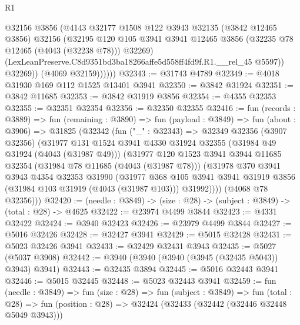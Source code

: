 \begin{lexlean}{R1}
\begin{coremodule}
                  @32156
                  @3856
                  (@4143
                    @32177
                    @1508
                    @122
                    @3943
                    @32135
                    (@3842 @12465 @3856)
                    @32156
                    (@32195
                      @120
                      @105
                      @3941
                      @3941
                      @12465
                      @3856
                      (@32235 @78 @12465 (@4043 (@32238 @78)))
                      @32269)
                    (LexLeanPreserve.C8d9351bd3ba18266affe5d558ff4fd9f.R1.__rel_45 @5597))
                  @32269))
              (@4069 @32159))))))
@32343 := @31743 @4789
@32349 := @4018 @31930 @169 @112 @1525 @13401 @3941
@32350 := @3842 @31924
@32351 := @3842 @11685
@32353 := @3842 @31919 @3856
@32354 := @4355 @32353
@32355 := @32351 @32354
@32356 := @32350 @32355
@32416 := fun (records : @3889) =>
  fun (remaining : @3890) =>
  fun (payload : @3849) =>
  fun (about : @3906) =>
  @31825
    (@32342
      (fun ("_" : @32343) =>
      @32349
        @32356
        (@3907 @32356)
        (@31977
          @131
          @1524
          @3941
          @4330
          @31924
          @32355
          (@31984 @49 @31924 (@4043 (@31987 @49)))
          (@31977
            @120
            @1523
            @3941
            @3944
            @11685
            @32354
            (@31984 @78 @11685 (@4043 (@31987 @78)))
            (@31978
              @370
              @3941
              @3943
              @4354
              @32353
              @31990
              (@31977
                @368
                @105
                @3941
                @3941
                @31919
                @3856
                (@31984 @103 @31919 (@4043 (@31987 @103)))
                @31992))))
        (@4068 @78 @32356)))
@32420 := (needle : @3849) -> (size : @28) -> (subject : @3849) -> (total : @28) -> @4625
@32422 := @23974 @4499 @3844
@32423 := @4331 @32422
@32424 := @3940 @32423
@32426 := @23979 @4499 @3844
@32427 := @5016 @32426
@32428 := @32427 @3941
@32429 := @5015 @32428
@32431 := @5023 @32426 @3941
@32433 := @32429 @32431 @3943
@32435 := @5027 (@5037 @3908)
@32442 := @3940 (@3940 (@3940 (@3945 (@32435 @5043)) @3943) @3941)
@32443 := @32435 @3894
@32445 := @5016 @32443 @3941
@32446 := @5015 @32445
@32448 := @5023 @32443 @3941
@32459 := fun (needle : @3849) =>
  fun (size : @28) =>
  fun (subject : @3849) =>
  fun (total : @28) => fun (position : @28) => @32424 (@32433 (@32442 (@32446 @32448 @5049 @3943)))

\end{coremodule}
\end{lexlean}
